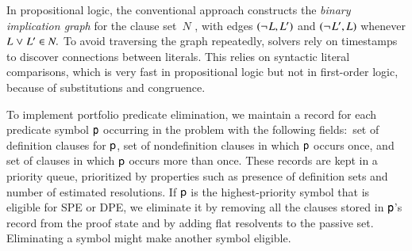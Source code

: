 

In propositional logic, the conventional approach constructs the
\emph{binary implication graph} for the clause set~$N$
\cite{hjb-2011-big-simplification}, with edges $(\neg{\kern.2ex L}, L')$ and
$(\neg{\kern.2ex L'}, L)$ whenever $L \mathrel{\lor} L' \in N.$ To avoid traversing the graph
repeatedly, solvers rely on timestamps to discover connections between
literals. This relies on syntactic literal comparisons, which is very
fast in propositional logic but not in first-order logic, because of
substitutions and congruence.

% 
To implement portfolio predicate elimination, we maintain a record for each
predicate symbol $\mathsf{p}$ occurring in the problem with the
following fields:\
set of definition clauses for $\mathsf{p}$, set of nondefinition clauses in which
$\mathsf{p}$ occurs once, and set of clauses in which $\mathsf{p}$ occurs more than
once. These records are kept in a priority queue, prioritized by properties such
as presence of definition sets and number of estimated resolutions. If
$\mathsf{p}$ is the highest-priority symbol that is eligible for SPE or DPE, we
eliminate it by removing all the clauses stored in $\mathsf{p}$'s record from the
proof state and by adding flat resolvents to the passive set.
Eliminating a symbol might make another symbol eligible.

